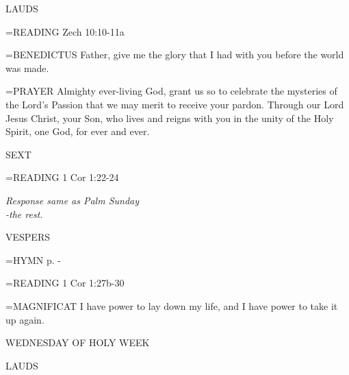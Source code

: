 \begin{flushleft}\normalsize LAUDS\\\end{flushleft}

\hangindent=\parindent \small{READING}    Zech 10:10-11a \textbf{   \\}

\hangindent=\parindent \small{BENEDICTUS 	Father, give me the glory that I had with you before the world was made.\\}

\hangindent=\parindent \small{PRAYER 	Almighty ever-living God, grant us so to celebrate the mysteries of the Lord's Passion that we may merit to receive your pardon. Through our Lord Jesus Christ, your Son, who lives and reigns with you in the unity of the Holy Spirit, one God, for ever and ever.}

\begin{flushleft}\normalsize SEXT\\\end{flushleft}

\hangindent=\parindent \small{READING}    1 Cor 1:22-24 \textbf{   }

\begin{center}
\textit{Response same as Palm Sunday\\
-the rest.}
\end{center}

\begin{flushleft}\normalsize VESPERS\\\end{flushleft}

\hangindent=\parindent \small{\uppercase{HYMN} p.  \pageref{holyweek:firstHymn} - \pageref{holyweek:lastHymn}\\}

\hangindent=\parindent \small{READING}    1 Cor 1:27b-30 \textbf{   \\}

\hangindent=\parindent \small{MAGNIFICAT 	I have power to lay down my life, and I have power to take it up again.\\}

\begin{center}
\normalsize WEDNESDAY OF HOLY WEEK
\end{center}

\begin{flushleft}\normalsize LAUDS\\\end{flushleft}

